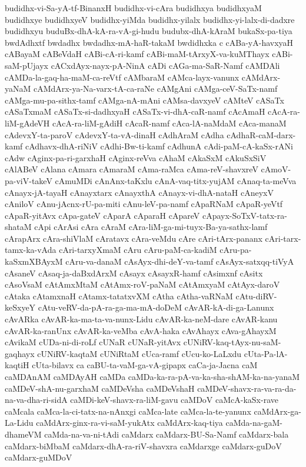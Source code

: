 {budidhx-vi-Sa-yA-tf-BinanxH
budidhx-vi-cAra
budidhxya
budidhxyaM
budidhxye
budidhxyeV
budidhx-yiMda
budidhx-yilalx
budidhx-yi-lalx-di-dadxre
budidhxyu
buduBx-dhA-kA-ra-vA-gi-hudu
budubx-dhA-kAraM
bukaSx-pa-tiya
bwdAdhxtf
bwdadhx
bwdadhx-mA-haR-takaM
bwdidhxka
c
cABa-yA-havxyaH
cABayaM
cABeVdaH
cABi-cA-ri-kamf
cABi-maM-tArxyX-va-kuMThayx
cABi-saM-pUjayx
cACxdAyx-nayx-pA-NinA
cADi
cAGa-ma-SaR-Namf
cAMDAli
cAMDa-la-gaq-ha-maM-ca-reVtf
cAMbaraM
cAMca-layx-vanunx
cAMdArx-yaNaM
cAMdArx-ya-Na-varx-tA-ca-raNe
cAMgAni
cAMga-ceV-SaTx-namf
cAMga-mu-pa-sithx-tamf
cAMga-nA-mAni
cAMsa-davxyeV
cAMteV
cASaTx
cASaTxmaM
cASaTx-si-dadhxyaH
cASaTx-vi-dhA-caR-namf
cAcAmaH
cAcA-ra-liM-gAdeVH
cAcA-ra-liM-gAdiH
cAcaR-namf
cAca-lA-naMdaM
cAca-manaM
cAdevxY-ta-paroV
cAdevxY-ta-vA-dinaH
cAdhAraM
cAdha
cAdhaR-caM-darx-kamf
cAdhavx-dhA-riNiV
cAdhi-Bw-ti-kamf
cAdhunA
cAdi-paM-cA-kaSx-rANi
cAdw
cAginx-pa-ri-garxhaH
cAginx-reVva
cAhaM
cAkaSxM
cAkuSxSiV
cAlABeV
cAlana
cAmara
cAmaraM
cAma-raMca
cAma-reV-shavxreV
cAmoV-pa-viV-takeV
cAmuMDi
cAnAnx-taKxlu
cAnA-vaq-titx-yujAM
cAnaq-ta-meVva
cAnayx-jA-tayaH
cAnayxtarx
cAnayxthA
cAnayx-vi-dhA-nataH
cAneyxV
cAniloV
cAnu-jAcnx-rU-pa-miti
cAnu-leV-pa-namf
cApaRNaM
cApaR-yeVtf
cApaR-yitAvx
cApa-gateV
cAparA
cAparaH
cApareV
cApayx-SoTxV-tatx-ra-shataM
cApi
cArAsi
cAra
cAraM
cAra-liM-ga-mi-tuyx-Ba-ya-sathx-lamf
cArapArx
cAra-shiVlaM
cAratavx
cAra-veMdu
cAre
cAri-tArx-pananx
cAri-tarx-tamx-ka-vAda
cAri-tarxyXmaM
cAru
cAru-paM-ca-kadiM
cAru-pa-kaSxmXBAyxM
cAru-va-danaM
cAsAyx-dhi-deY-va-tamf
cAsAyx-satxqq-tiVyA
cAsaneV
cAsaq-ja-daBxdArxM
cAsayx
cAsayxR-hamf
cAsimxnf
cAsitx
cAsoVsaM
cAtAmxMtaM
cAtAmx-roV-paNaM
cAtAmxyaM
cAtAyx-daroV
cAtaka
cAtamxnaH
cAtamx-tatatxvXM
cAtha
cAtha-vaRNaM
cAtu-diRV-keSxyeY
cAtu-veRV-da-pA-ra-ga-ma-mA-doDeM
cAvAR-kA-di-ga-Lanunx
cAvARka
cAvAR-ka-ma-ta-va-nunx-Lidu
cAvAR-ka-neM-dare
cAvAR-kanu
cAvAR-ka-ranUnx
cAvAR-ka-veMba
cAvA-haka
cAvAhayx
cAva-gAhayxM
cAvikaM
cUDa-ni-di-roLf
cUNaR
cUNaR-yitAvx
cUNiRV-kaq-tAyx-nu-saM-gaqhayx
cUNiRV-kaqtaM
cUNiRtaM
cUca-ramf
cUcu-ko-LaLxdu
cUta-Pa-lA-kaqtiH
cUta-bilavx
ca
caBU-ta-vaM-ga-vA-gipapx
caCa-ja-Jacna
caM
caMDAnAM
caMDAyAH
caMDa
caMDa-ka-ra-pA-va-ka-sha-shAM-ka-na-yanaM
caMDeV-shA-nu-garxhaM
caMDeVsha
caMDeVshaH
caMDeV-shavx-ra-va-ra-da-na-va-dha-ri-sidA
caMDi-keV-shavx-ra-liM-gavu
caMDoV
caMcA-kaSx-rave
caMcala
caMca-la-ci-tatx-na-nAnxgi
caMca-late
caMca-la-te-yanunx
caMdArx-ga-La-Lidu
caMdArx-ginx-ra-vi-saM-yukAtx
caMdArx-kaq-tiya
caMda-na-gaM-dhameVM
caMda-na-va-ni-tAdi
caMdarx
caMdarx-BU-Sa-Namf
caMdarx-bala
caMdarx-biMbaM
caMdarx-dhA-ra-riV-shavxra
caMdarxge
caMdarx-guDoV
caMdarx-guMDoV
}

